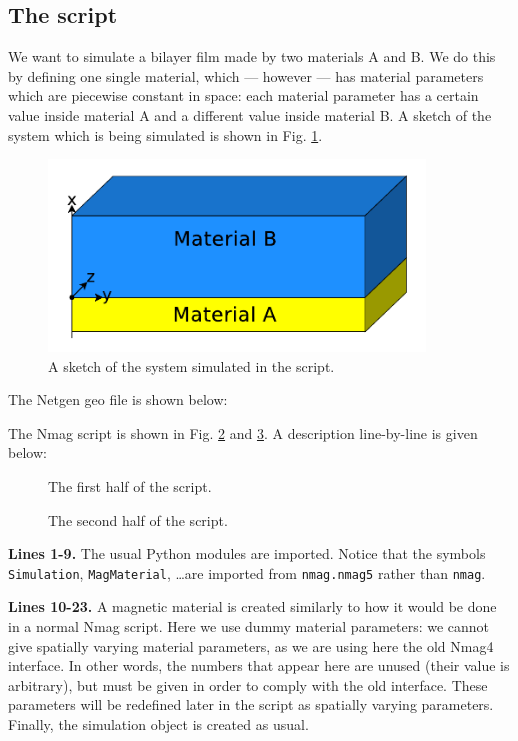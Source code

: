 \documentclass[11pt,oneside,openany]{article}
\begin{document}
\subsection{The script}
We want to simulate a bilayer film made by two materials A and B.
We do this by defining one single material, which --- however --- has
material parameters which are piecewise constant in space: each material
parameter has a certain value inside material A and a different value
inside material B. A sketch of the system which is being simulated is
shown in Fig. \ref{fig:sketch}.
\begin{figure}[t]
\begin{center}
\includegraphics[width=10.0cm]{sketch}
\caption[Sketch]{A sketch of the system simulated in the script.}
\label{fig:sketch}
\end{center}
\end{figure}
The Netgen geo file is shown below:


The Nmag script is shown in Fig. \ref{fig:script_1of2} and 
\ref{fig:script_2of2}. A description line-by-line is given below:
\begin{figure}[!p]

\caption{The first half of the script.}
\label{fig:script_1of2}
\end{figure}

\begin{figure}[!p]

\caption{The second half of the script.}
\label{fig:script_2of2}
\end{figure}

\textbf{Lines 1-9.} The usual Python modules are imported.
Notice that the symbols \verb|Simulation|, \verb|MagMaterial|,
\ldots are imported from \verb|nmag.nmag5| rather than \verb|nmag|.

\textbf{Lines 10-23.} A magnetic material is created similarly to how
it would be done in a normal Nmag script. Here we use dummy material
parameters: we cannot give spatially varying material parameters, as
we are using here the old Nmag4 interface. In other words, the numbers
that appear here are unused (their value is arbitrary), but must be given
in order to comply with the old interface. These parameters will be
redefined later in the script as spatially varying parameters.
Finally, the simulation object is created as usual.
\end{document}
